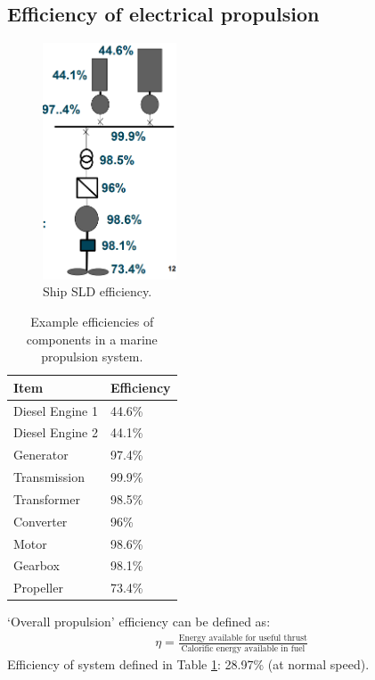 \subsection{Efficiency of electrical propulsion}
\begin{figure}[H]
    \centering
    \includegraphics[height = 7cm]{img/figure55.png}
    \caption{Ship SLD efficiency.}
\end{figure}
\begin{table}[H]
    \centering
    \begin{tabular}{@{}ll@{}}
        \toprule
        \textbf{Item}   & \textbf{Efficiency} \\
        \midrule
        Diesel Engine 1 & 44.6\%              \\
        Diesel Engine 2 & 44.1\%              \\
        Generator       & 97.4\%              \\
        Transmission    & 99.9\%              \\
        Transformer     & 98.5\%              \\
        Converter       & 96\%                \\
        Motor
                        & 98.6\%              \\
        Gearbox         & 98.1\%              \\
        Propeller       & 73.4\%              \\
        \bottomrule
    \end{tabular}
    \caption{Example efficiencies of components in a marine propulsion system.}
    \label{8.t1}
\end{table}
`Overall propulsion' efficiency can be defined as:
\begin{gather}
    \eta = \frac{\textrm{Energy available for useful thrust}}{\textrm{Calorific energy available in fuel}}
\end{gather}
Efficiency of system defined in Table \ref{8.t1}: 28.97\% (at normal speed).
